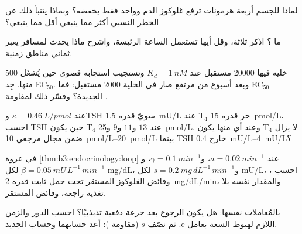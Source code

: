 \begin{exercise}[$\star$]\label{exo:b3:endocrinology:3}
لماذا للجسم أربعة هرمونات ترفع غلوكوز الدم وواحد فقط يخفضه؟
وبماذا يتنبأ ذلك عن الخطر النسبي  أكثر مما ينبغي
 أقل مما ينبغي؟
\end{exercise}

\begin{exercise}[$\star$]\label{exo:b3:endocrinology:4}
ما ؟ اذكر ثلاثة، وقل أيها تستعمل الساعة الرئيسة،
واشرح ماذا يحدث لمسافر يعبر ثماني مناطق زمنية.
\end{exercise}

\begin{exercise}[$\star\star$]\label{exo:b3:endocrinology:5}
خلية فيها \num{20000} مستقبل عند $K_{d} = \qty{1}{nM}$ وتستجيب
استجابة قصوى حين يُشغَل \num{500} منها. جِد EC$_{50}$. وبعد
أسبوع من  مرتفع صار في الخلية \num{2000} مستقبل: فما
EC$_{50}$ الجديدة؟ وفسّر ذلك لمقاومة .
\end{exercise}

\begin{exercise}[$\star\star$]\label{exo:b3:endocrinology:6}
عند $\kappa = \qty{0.46}{L/pmol}$ وTSH سويّ قدره \qty{1.5}{mU/L}
عند T$_{4}$ حر قدره \qty{15}{pmol/L}، احسب TSH حين يكون
T$_{4}$ عند $13$ و$11$ و$9$ و\qty{25}{pmol/L}. وعند أي منها
يكون T$_{4}$ لا يزال ضمن مجال مرجعي \qtyrange{10}{20}{pmol/L}
بينما TSH خارج \qtyrange{0.4}{4}{mU/L}؟
\end{exercise}

\begin{exercise}[$\star\star$]\label{exo:b3:endocrinology:7}
في عروة \cref{thm:b3:endocrinology:loop} عند $a = \qty{0.02}{min^{-1}}$،
و$\gamma = \qty{0.1}{min^{-1}}$، و$\beta = \qty{0.05}{mU\,L^{-1}\,min^{-1}}$
لكل mg/dL، و$s = \qty{0.2}{mg\,dL^{-1}\,min^{-1}}$ لكل mU/L، احسب
، وفائض الغلوكوز المستقر تحت حمل ثابت قدره
\qty{2}{mg/dL/min}، والمقدار نفسه بلا تغذية راجعة، وفائض
 المستقر.
\end{exercise}

\begin{exercise}[$\star\star$]\label{exo:b3:endocrinology:8}
بالمُعاملات نفسها: هل يكون الرجوع بعد جرعة دفعية تذبذبيًا؟
احسب الدور والزمن اللازم لهبوط السعة بعامل $\mathrm{e}$. ثم
نصّف $s$ (مقاومة ): أعد حسابهما وحساب 
الجديد.
\end{exercise}

